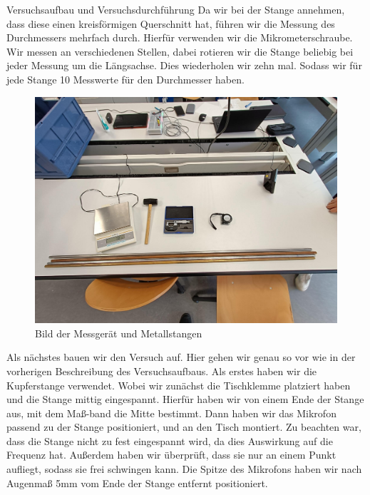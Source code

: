 \documentclass[twoside]{protokoll}
\begin{document}
\begin{aufgabe}{Versuchsaufbau und Versuchsdurchführung}
Da wir bei der Stange annehmen, dass diese einen kreisförmigen Querschnitt hat, führen wir die Messung des Durchmessers mehrfach durch. Hierfür verwenden wir die Mikrometerschraube. Wir messen an verschiedenen Stellen, dabei rotieren wir die Stange beliebig bei jeder Messung um die Längsachse. Dies wiederholen wir zehn mal. Sodass wir für jede Stange 10 Messwerte für den Durchmesser haben.\\ 

\begin{figure}[H]
  \centering
  \includegraphics[width=1.0\textwidth]{Bilder/434170_428396_1A3_Materialien.pdf}
  \caption{Bild der Messgerät und Metallstangen}
  \centering
\end{figure}

Als nächstes bauen wir den Versuch auf. Hier gehen wir genau so vor wie in der vorherigen Beschreibung des Versuchsaufbaus. Als erstes haben wir die Kupferstange verwendet.
Wobei wir zunächst die Tischklemme platziert haben und die Stange mittig eingespannt. Hierfür haben wir von einem Ende der Stange aus, mit dem Maß-band die Mitte bestimmt. Dann haben wir das Mikrofon passend zu der Stange positioniert, und an den Tisch montiert.
Zu beachten war, dass die Stange nicht zu fest eingespannt wird, da dies Auswirkung auf die Frequenz hat.
Außerdem haben wir überprüft, dass sie nur an einem Punkt aufliegt, sodass sie frei schwingen kann.
Die Spitze des Mikrofons haben wir nach Augenmaß 5mm vom Ende der Stange entfernt positioniert.


\end{aufgabe}
\end{document}
